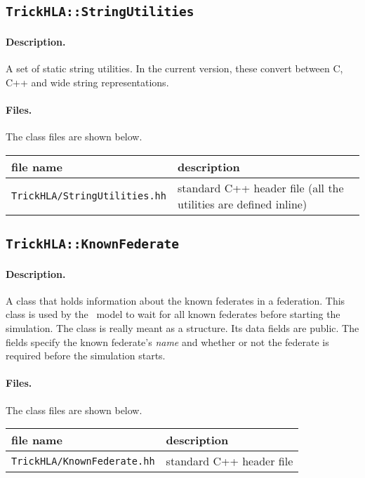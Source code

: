 \subsection{{\tt TrickHLA::StringUtilities}}

\paragraph{Description.}
A set of static string utilities.
In the current version, these convert between C, C++ and wide
string representations.

\paragraph{Files.}
The class files are shown below.
   
{
  \scriptsize
  \begin{tabular}{|l|l|} 
    \hline
    file name & description \\
    \hline \hline
    {\tt TrickHLA/StringUtilities.hh} 
    & standard C++ header file
      (all the utilities are defined inline)
    \\ \hline
  \end{tabular}
}

\subsection{{\tt TrickHLA::KnownFederate}}

\paragraph{Description.}
A class that holds information about the known federates in a federation.
This class is used by the \TrickHLA\ model to wait for all known federates
before starting the simulation.
The class is really meant as a structure. Its data fields are public.
The fields specify the known federate's {\em name} and whether or not
the federate is required before the simulation starts.

\paragraph{Files.}
The class files are shown below.
   
{
  \scriptsize
  \begin{tabular}{|l|l|} 
    \hline
    file name & description \\
    \hline \hline
    {\tt TrickHLA/KnownFederate.hh} 
    & standard C++ header file
    \\ \hline
  \end{tabular}
}

